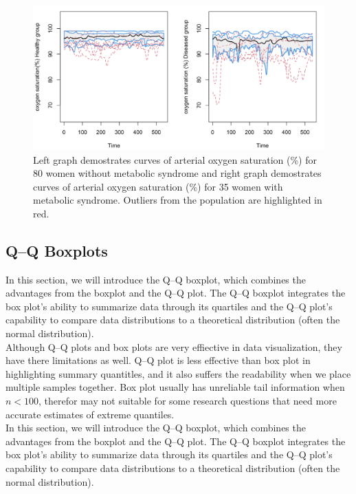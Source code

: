 \documentclass{article}\usepackage[]{graphicx}\usepackage[]{xcolor}
\numberwithin{equation}{section}
\begin{document}
\begin{figure}[H]
    \centering
    \includegraphics[width=1\textwidth]{image_reference/fbplot.png}
    \caption{Left graph demostrates curves of arterial oxygen saturation (\%) for 80 women without metabolic syndrome and right graph demostrates curves of arterial oxygen saturation (\%) for 35 women with metabolic syndrome. Outliers from the population are highlighted in red.}
    \label{fig:fbplot}
\end{figure}

\subsection{Q–Q Boxplots}
In this section, we will introduce the Q–Q boxplot, which combines the advantages from the boxplot and the Q–Q plot. The Q–Q boxplot integrates the box plot's ability to summarize data through its quartiles and the Q–Q plot's capability to compare data distributions to a theoretical distribution (often the normal distribution).\\

\noindent 
Although Q–Q plots and box plots are very effiective in data visualization, they have there limitations as well. Q–Q plot is less effective than box plot in highlighting summary quantitles, and it also suffers the readability when we place multiple samples together. Box plot usually has unreliable tail information when $n<100$, therefor may not suitable for some research questions that need more accurate estimates of extreme quantiles.\\

\noindent
In this section, we will introduce the Q–Q boxplot, which combines the advantages from the boxplot and the Q–Q plot. The Q–Q boxplot integrates the box plot's ability to summarize data through its quartiles and the Q–Q plot's capability to compare data distributions to a theoretical distribution (often the normal distribution).\\
\end{document}
